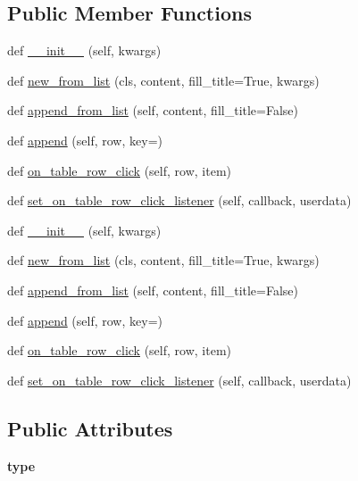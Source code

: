 \subsection*{Public Member Functions}
\begin{DoxyCompactItemize}
\item 
def \hyperlink{classremi_1_1gui_1_1Table_a50e1ebd82728fbd47318b5c16fc1f272}{\+\_\+\+\_\+init\+\_\+\+\_\+} (self, kwargs)
\item 
def \hyperlink{classremi_1_1gui_1_1Table_a9657491417c2b88f6de318d4c36279b1}{new\+\_\+from\+\_\+list} (cls, content, fill\+\_\+title=True, kwargs)
\item 
def \hyperlink{classremi_1_1gui_1_1Table_aa224fd86a90c9b8c3a5e56a3b6362648}{append\+\_\+from\+\_\+list} (self, content, fill\+\_\+title=False)
\item 
def \hyperlink{classremi_1_1gui_1_1Table_aaf7ae8ac5660acb197e4beffd1eea871}{append} (self, row, key=\textquotesingle{}\textquotesingle{})
\item 
def \hyperlink{classremi_1_1gui_1_1Table_a1c0ef0c9820527fb6a22eacfbdd5e37f}{on\+\_\+table\+\_\+row\+\_\+click} (self, row, item)
\item 
def \hyperlink{classremi_1_1gui_1_1Table_a9bcf535f481bd527f336c5565bfc663a}{set\+\_\+on\+\_\+table\+\_\+row\+\_\+click\+\_\+listener} (self, callback, userdata)
\item 
def \hyperlink{classremi_1_1gui_1_1Table_a50e1ebd82728fbd47318b5c16fc1f272}{\+\_\+\+\_\+init\+\_\+\+\_\+} (self, kwargs)
\item 
def \hyperlink{classremi_1_1gui_1_1Table_a9657491417c2b88f6de318d4c36279b1}{new\+\_\+from\+\_\+list} (cls, content, fill\+\_\+title=True, kwargs)
\item 
def \hyperlink{classremi_1_1gui_1_1Table_aa224fd86a90c9b8c3a5e56a3b6362648}{append\+\_\+from\+\_\+list} (self, content, fill\+\_\+title=False)
\item 
def \hyperlink{classremi_1_1gui_1_1Table_aaf7ae8ac5660acb197e4beffd1eea871}{append} (self, row, key=\textquotesingle{}\textquotesingle{})
\item 
def \hyperlink{classremi_1_1gui_1_1Table_a1c0ef0c9820527fb6a22eacfbdd5e37f}{on\+\_\+table\+\_\+row\+\_\+click} (self, row, item)
\item 
def \hyperlink{classremi_1_1gui_1_1Table_a9bcf535f481bd527f336c5565bfc663a}{set\+\_\+on\+\_\+table\+\_\+row\+\_\+click\+\_\+listener} (self, callback, userdata)
\end{DoxyCompactItemize}
\subsection*{Public Attributes}
\begin{DoxyCompactItemize}
\item 
{\bfseries type}\hypertarget{classremi_1_1gui_1_1Table_afead5a61a04602406efbac35b3699b0c}{}\label{classremi_1_1gui_1_1Table_afead5a61a04602406efbac35b3699b0c}

\end{DoxyCompactItemize}
